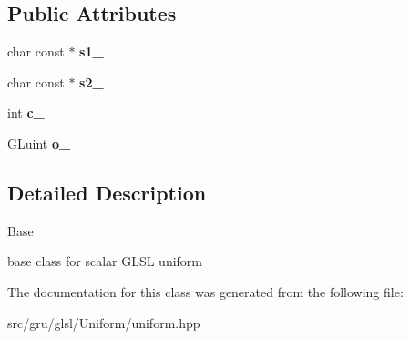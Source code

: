 \subsection*{\-Public \-Attributes}
\begin{DoxyCompactItemize}
\item 
\hypertarget{classglutpp_1_1glsl_1_1Uniform_1_1Scalar_1_1Base_a5c9c445fd16457fa05673a9b865713a0}{char const $\ast$ {\bfseries s1\-\_\-}}\label{classglutpp_1_1glsl_1_1Uniform_1_1Scalar_1_1Base_a5c9c445fd16457fa05673a9b865713a0}

\item 
\hypertarget{classglutpp_1_1glsl_1_1Uniform_1_1Scalar_1_1Base_aceb78857ff594fd91888d427a665b44b}{char const $\ast$ {\bfseries s2\-\_\-}}\label{classglutpp_1_1glsl_1_1Uniform_1_1Scalar_1_1Base_aceb78857ff594fd91888d427a665b44b}

\item 
\hypertarget{classglutpp_1_1glsl_1_1Uniform_1_1Scalar_1_1Base_a16942605ccfae14f5f47f7643b33ae70}{int {\bfseries c\-\_\-}}\label{classglutpp_1_1glsl_1_1Uniform_1_1Scalar_1_1Base_a16942605ccfae14f5f47f7643b33ae70}

\item 
\hypertarget{classglutpp_1_1glsl_1_1Uniform_1_1Scalar_1_1Base_a298377b06bcb7404ad4cf950ca644a29}{\-G\-Luint {\bfseries o\-\_\-}}\label{classglutpp_1_1glsl_1_1Uniform_1_1Scalar_1_1Base_a298377b06bcb7404ad4cf950ca644a29}

\end{DoxyCompactItemize}


\subsection{\-Detailed \-Description}
\-Base 

base class for scalar \-G\-L\-S\-L uniform 

\-The documentation for this class was generated from the following file\-:\begin{DoxyCompactItemize}
\item 
src/gru/glsl/\-Uniform/uniform.\-hpp\end{DoxyCompactItemize}
